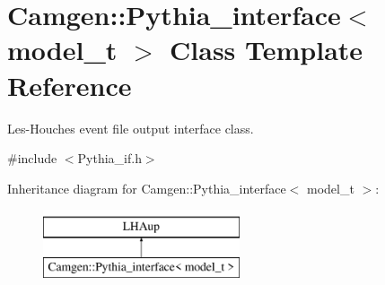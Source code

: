 \hypertarget{a00448}{\section{Camgen\-:\-:Pythia\-\_\-interface$<$ model\-\_\-t $>$ Class Template Reference}
\label{a00448}
}


Les-\/\-Houches event file output interface class.  




{\ttfamily \#include $<$Pythia\-\_\-if.\-h$>$}

Inheritance diagram for Camgen\-:\-:Pythia\-\_\-interface$<$ model\-\_\-t $>$\-:\begin{figure}[H]
\begin{center}
\leavevmode
\includegraphics[height=2.000000cm]{a00448}
\end{center}
\end{figure}
